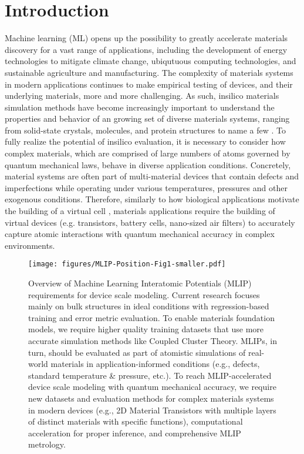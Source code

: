 \section{Introduction}

Machine learning (ML) opens up the possibility to greatly accelerate materials discovery for a vast range of applications, including the development of energy technologies to mitigate climate change, ubiqutuous computing technologies, and sustainable agriculture and manufacturing. 
The complexity of materials systems in modern applications continues to make empirical testing of devices, and their underlying materials, more and more challenging. As such, insilico materials simulation methods have become increasingly important to understand the properties and behavior of an growing set of diverse materials systems, ranging from solid-state crystals, molecules, and protein structures to name a few \citep{zeni2025generative, miret2024perspective, zitnick2020introduction, lee2023towards, terwilliger2024alphafold}. To fully realize the potential of insilico evaluation, it is necessary to consider how complex materials, which are comprised of large numbers of atoms governed by quantum mechanical laws, behave in diverse application conditions. Concretely, material systems are often part of multi-material devices that contain defects and imperfections while operating under various temperatures, pressures and other exogenous conditions. Therefore, similarly to how biological applications motivate the building of a virtual cell \citep{bunne2024build}, materials applications require the building of virtual devices (e.g. transistors, battery cells, nano-sized air filters) to accurately capture atomic interactions with quantum mechanical accuracy in complex environments. 


\begin{figure*}[t]
    \centering
    \texttt{[image: figures/MLIP-Position-Fig1-smaller.pdf]}
    \vspace{-0.80cm}
    \caption{Overview of Machine Learning Interatomic Potentials (MLIP) requirements for device scale modeling. Current research focuses mainly on bulk structures in ideal conditions with regression-based training and error metric evaluation. To enable materials foundation models, we require higher quality training datasets that use more accurate simulation methods like Coupled Cluster Theory. MLIPs, in turn, should be evaluated as part of atomistic simulations of real-world materials in application-informed conditions (e.g., defects, standard temperature \& pressure, etc.). To reach MLIP-accelerated device scale modeling with quantum mechanical accuracy, we require new datasets and evaluation methods for complex materials systems in modern devices (e.g., 2D Material Transistors with multiple layers of distinct materials with specific functions), computational acceleration for proper inference, and comprehensive MLIP metrology.}
    \label{fig:mlip-req}
    \vspace{-0.50cm}
\end{figure*}


